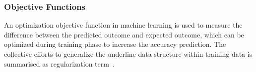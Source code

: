 \subsubsection{Objective Functions}
An optimization objective function in machine learning is used to measure the difference between the predicted outcome and expected outcome, which can be optimized during training phase to increase the accuracy  prediction. The collective efforts to generalize the underline data structure within training data is summarised as regularization term~\cite{goodfellow_2015}.  